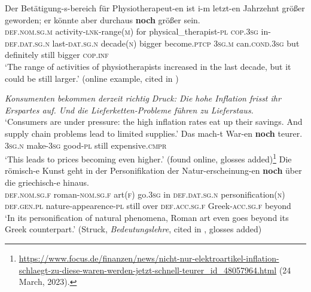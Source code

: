 \begin{exe}
	\ex
	\gll Der Betätigung-s-bereich für Physiotherapeut-en ist i-m letzt-en Jahrzehnt größer geworden; er könnte aber durchaus \textbf{noch} größer sein.\\
\textsc{def}.\textsc{nom}.\textsc{sg}.\textsc{m} activity-\textsc{lnk}-range(\textsc{m}) for physical\_therapist-\textsc{pl} \textsc{cop}.3\textsc{sg} in-\textsc{def}.\textsc{dat}.\textsc{sg}.\textsc{n} last-\textsc{dat}.\textsc{sg}.\textsc{n} decade(\textsc{n}) bigger become.\textsc{ptcp} 3\textsc{sg}.\textsc{m} can.\textsc{cond}.3\textsc{sg} but definitely still bigger \textsc{cop}.\textsc{inf}\\
	\glt \lq The range of activities of physiotherapists increased in the last decade, but it could be still larger.' (online example, cited in \cite[544]{Umbach2009})

	\ex\textit{Konsumenten bekommen derzeit richtig Druck: Die hohe Inflation frisst ihr Erspartes auf. Und die Lieferketten-Probleme führen zu Lieferstaus.}\\
\lq Consumers are under pressure: the high inflation rates eat up their savings. And supply chain problems lead to limited supplies.\rq
	\exi{}\gll Das mach-t War-en \textbf{noch} teurer.\\
3\textsc{sg}.\textsc{n} make-3\textsc{sg} good-\textsc{pl} still expensive.\textsc{cmpr}\\
	\glt \lq This leads to prices becoming even higher.\rq{ }(found online, glosses added)\footnote{\url{https://www.focus.de/finanzen/news/nicht-nur-elektroartikel-inflation-schlaegt-zu-diese-waren-werden-jetzt-schnell-teurer_id_48057964.html} (24 March, 2023).}
	\ex\label{exAppendixGermanComparative3}
	\gll Die römisch-e Kunst geht in der Personifikation der Natur-erscheinung-en \textbf{noch} über die griechisch-e hinaus.\\
	\textsc{def}.\textsc{nom}.\textsc{sg}.\textsc{f} roman-\textsc{nom}.\textsc{sg}.\textsc{f} art(\textsc{f}) go.3\textsc{sg} in \textsc{def}.\textsc{dat}.\textsc{sg}.\textsc{n} personification(\textsc{n}) \textsc{def}.\textsc{gen}.\textsc{pl} nature-appearence-\textsc{pl} still over \textsc{def}.\textsc{acc}.\textsc{sg}.\textsc{f} Greek-\textsc{acc}.\textsc{sg}.\textsc{f} beyond\\
	\glt \lq In its personification of natural phenomena, Roman art even goes beyond its Greek counterpart.' (Struck, \textit{Bedeutungslehre}, cited in \cite[62]{Shetter1966}, glosses added)
	

\end{exe}
